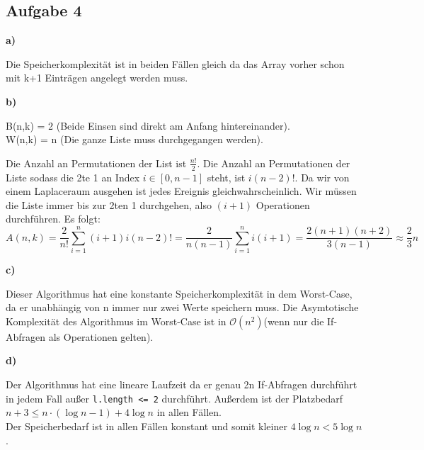 \documentclass[a4paper,graphics,11pt]{article}
\newcommand{\aufgabe}[1]{\subsection*{Aufgabe #1}}
\begin{document}
\aufgabe{4}
\textbf{a)}

Die Speicherkomplexität ist in beiden Fällen gleich da das Array vorher schon mit k+1 Einträgen angelegt werden muss.

\textbf{b)}

B(n,k) = 2 \quad (Beide Einsen sind direkt am Anfang hintereinander).\\
W(n,k) = n  \quad (Die ganze Liste muss durchgegangen werden).

Die Anzahl an Permutationen der List ist $\frac{n!}{2}$.
Die Anzahl an Permutationen der Liste sodass die 2te 1 an Index $i \in [0, n-1]$ steht, ist
$i(n - 2)!$. Da wir von einem Laplaceraum ausgehen ist jedes Ereignis gleichwahrscheinlich. Wir müssen die Liste
immer bis zur 2ten 1 durchgehen, also $(i+1)$ Operationen durchführen. Es folgt:
$$
    A(n,k) = \frac{2}{n!}\sum_{i=1}^{n}(i+1) i(n-2)!
    = \frac{2}{n(n-1)} \sum_{i=1}^{n} i(i+1)
    = \frac{2(n+1)(n+2)}{3(n-1)} \approx \frac{2}{3}n
$$

\textbf{c)}



Dieser Algorithmus hat eine konstante Speicherkomplexität in dem Worst-Case, da er unabhängig von n immer nur zwei Werte speichern muss.
Die Asymtotische Komplexität des Algorithmus im Worst-Case ist in $\mathcal{O}(n^2)$(wenn nur die If-Abfragen als Operationen gelten).
\newpage

\textbf{d)}


Der Algorithmus hat eine lineare Laufzeit da er genau 2n If-Abfragen durchführt in jedem Fall außer \texttt{l.length <= 2} durchführt.
Außerdem ist der Platzbedarf $n + 3 \le n\cdot(\log n-1 )+ 4\log n$ in allen Fällen.\\[50pt]



Der Speicherbedarf ist in allen Fällen konstant und somit kleiner $4\log n < 5 \log n$.
 
\end{document}
